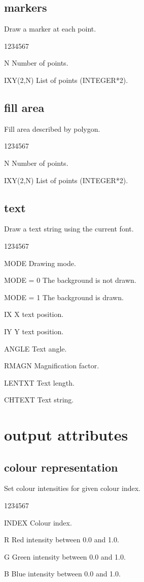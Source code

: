 \subsection{ markers}
%
\Action
Draw a marker at each point.
\Pdesc
\begin{DLtt}{1234567}
\item[N] Number of points.
\item[IXY(2,N)] List of points (INTEGER*2).
\end{DLtt}
\subsection{ fill area}
%
\Action
Fill area described by polygon.
\Pdesc
\begin{DLtt}{1234567}
\item[N] Number of points.
\item[IXY(2,N)] List of points (INTEGER*2).
\end{DLtt}
\subsection{ text}
%
\Action
Draw a text string using the current font.
\Pdesc
\begin{DLtt}{1234567}
\item[MODE]   Drawing mode.
\item[MODE = 0] The background is not drawn.
\item[MODE = 1] The background is drawn.
\item[IX]     X text position.
\item[IY]     Y text position.
\item[ANGLE]  Text angle.
\item[RMAGN]  Magnification factor.
\item[LENTXT] Text length.
\item[CHTEXT] Text string.
\end{DLtt}

%
%

\section{ output attributes}
\subsection{ colour representation}
%
\Action
Set colour intensities for given colour index.
\Pdesc
\begin{DLtt}{1234567}
\item[INDEX] Colour index.
\item[R] Red intensity between 0.0 and 1.0.
\item[G] Green intensity between 0.0 and 1.0.
\item[B] Blue intensity between 0.0 and 1.0.
\end{DLtt}

